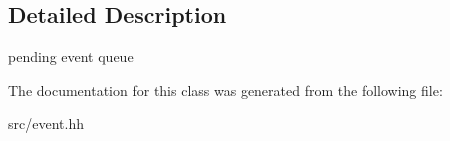 \subsection{Detailed Description}
pending event queue 

The documentation for this class was generated from the following file:\begin{DoxyCompactItemize}
\item 
src/event.hh\end{DoxyCompactItemize}
